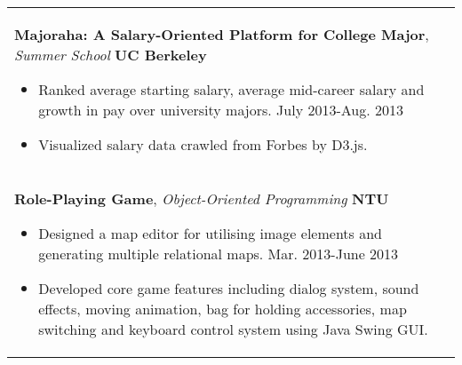 \documentclass[a4paper,10pt]{article} %
\begin{document}
{\begin{tabular}{p{18.5cm}}
%
{\fontsize{11}{13.2}\textbf{Majoraha: A Salary-Oriented Platform for College Major}}, {\it{Summer School}} \hfill \textbf{UC Berkeley} 
\vspace{0.5mm}
\begin{itemize}
\item Ranked average starting salary, average mid-career salary and growth in pay over university majors. \hfill July 2013-Aug. 2013
\item Visualized salary data crawled from Forbes by D3.js. \vspace*{-\baselineskip}
\end{itemize}\\
\vspace{0.5mm}

{\fontsize{11}{13.2}\textbf{Role-Playing Game}}, {\it{Object-Oriented Programming}} \hfill \textbf{NTU} 
\vspace{0.5mm}
\begin{itemize}
\item Designed a map editor for utilising image elements and generating multiple relational maps.  \hfill Mar. 2013-June 2013
\item Developed core game features including dialog system, sound effects, moving animation, bag for holding accessories, map switching and keyboard control system using Java Swing GUI.\vspace*{-\baselineskip}
\end{itemize}\\
\end{tabular}

}
\end{document}

